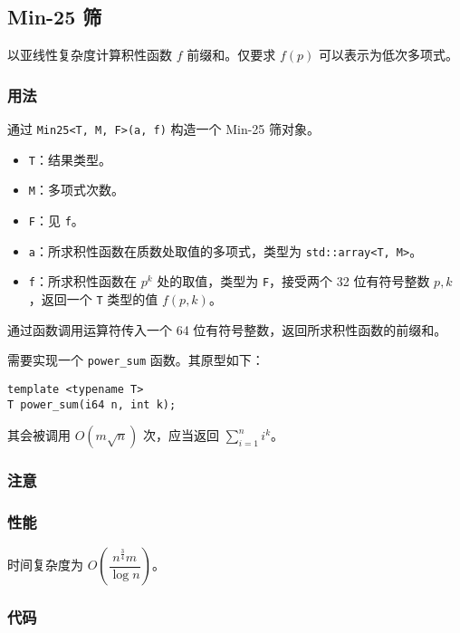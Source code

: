 \subsection{Min-25 筛}

以亚线性复杂度计算积性函数 $f$ 前缀和。仅要求 $f(p)$ 可以表示为低次多项式。

\subsubsection{用法}

通过 \lstinline{Min25<T, M, F>(a, f)} 构造一个 Min-25 筛对象。

\begin{itemize}
\item \lstinline{T}：结果类型。
\item \lstinline{M}：多项式次数。
\item \lstinline{F}：见 \lstinline{f}。
\item \lstinline{a}：所求积性函数在质数处取值的多项式，类型为 \lstinline{std::array<T, M>}。
\item \lstinline{f}：所求积性函数在 $p^k$ 处的取值，类型为 \lstinline{F}，接受两个 32 位有符号整数 $p, k$，返回一个 \lstinline{T} 类型的值 $f(p, k)$。
\end{itemize}

通过函数调用运算符传入一个 64 位有符号整数，返回所求积性函数的前缀和。

需要实现一个 \lstinline{power_sum} 函数。其原型如下：

\begin{lstlisting}
template <typename T>
T power_sum(i64 n, int k);
\end{lstlisting}

其会被调用 $O(m\sqrt{n})$ 次，应当返回 $\sum_{i = 1}^n i^k$。

\subsubsection{注意}

\subsubsection{性能}

时间复杂度为 $O\left(\dfrac{n^{\frac{3}{4}}m}{\log n}\right)$。

\subsubsection{代码}


